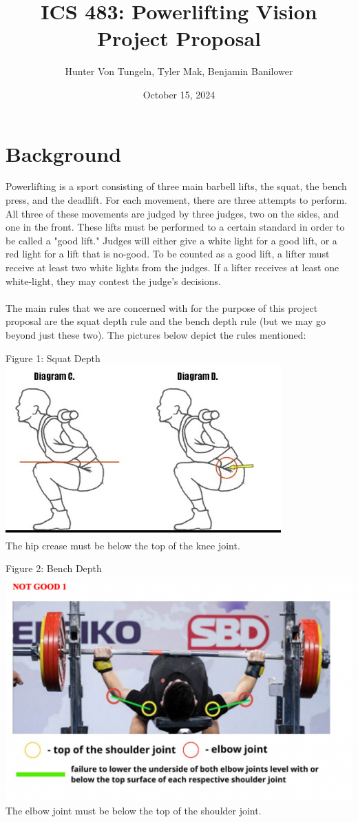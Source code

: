 \documentclass{article}
\title{ICS 483: Powerlifting Vision Project Proposal}
\author{Hunter Von Tungeln, Tyler Mak, Benjamin Banilower}
\date{October 15, 2024}
\begin{document}
\maketitle
\section{Background}
Powerlifting is a sport consisting of three main barbell lifts, the squat, the bench press, and the deadlift. For each movement, there are three attempts to perform. All three of these movements are judged by three judges, two on the sides, and one in the front. These lifts must be performed to a certain standard in order to be called a "good lift." Judges will either give a white light for a good lift, or a red light for a lift that is no-good. To be counted as a good lift, a lifter must receive at least two white lights from the judges. If a lifter receives at least one white-light, they may contest the judge's decisions. \\ \\
The main rules that we are concerned with for the purpose of this project proposal are the squat depth rule and the bench depth rule (but we may go beyond just these two). The pictures below depict the rules mentioned: 
\begin{center}
Figure 1: Squat Depth \\
\includegraphics[scale=0.30]{squat-depth.jpg}\\
The hip crease must be below the top of the knee joint. 
\end{center}
\begin{center}
Figure 2: Bench Depth \\
\includegraphics[scale=0.25]{bench-depth.png}\\
The elbow joint must be below the top of the shoulder joint.  
\end{center}
\end{document}
